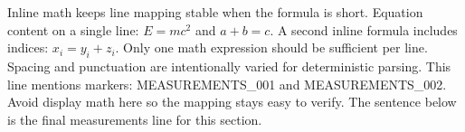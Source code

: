 Inline math keeps line mapping stable when the formula is short.
Equation content on a single line: $E = m c^2$ and $a+b=c$.
A second inline formula includes indices: $x_i = y_i + z_i$.
Only one math expression should be sufficient per line.
Spacing and punctuation are intentionally varied for deterministic parsing.
This line mentions markers: MEASUREMENTS\_001 and MEASUREMENTS\_002.
Avoid display math here so the mapping stays easy to verify.
The sentence below is the final measurements line for this section.
